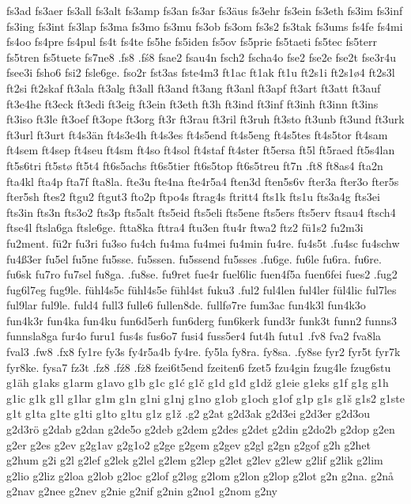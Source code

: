 fs3ad
fs3aer
fs3all
fs3alt
fs3amp
fs3an
fs3ar
fs3äus
fs3ehr
fs3ein
fs3eth
fs3im
fs3inf
fs3ing
fs3int
fs3lap
fs3ma
fs3mo
fs3mu
fs3ob
fs3om
fs3s2
fs3tak
fs3ums
fs4fe
fs4mi
fs4oo
fs4pre
fs4pul
fs4t
fs4te
fs5he
fs5iden
fs5ov
fs5prie
fs5taeti
fs5tec
fs5terr
fs5tren
fs5tuete
fs7ne8
.fs8
.fś8
fsae2
fsau4n
fsch2
fscha4o
fse2
fse2e
fse2t
fse3r4u
fsee3i
fsho6
fsi2
fsle6ge.
fso2r
fst3as
fste4m3
ft1ac
ft1ak
ft1u
ft2s1i
ft2s1ø4
ft2s3l
ft2si
ft2skaf
ft3ala
ft3alg
ft3all
ft3and
ft3ang
ft3anl
ft3apf
ft3art
ft3att
ft3auf
ft3e4he
ft3eck
ft3edi
ft3eig
ft3ein
ft3eth
ft3h
ft3ind
ft3inf
ft3inh
ft3inn
ft3ins
ft3iso
ft3le
ft3oef
ft3ope
ft3org
ft3r
ft3rau
ft3ril
ft3ruh
ft3sto
ft3unb
ft3und
ft3urk
ft3url
ft3urt
ft4s3än
ft4s3e4h
ft4s3es
ft4s5end
ft4s5eng
ft4s5tes
ft4s5tor
ft4sam
ft4sem
ft4sep
ft4seu
ft4sm
ft4so
ft4sol
ft4staf
ft4ster
ft5ersa
ft5l
ft5raed
ft5s4lan
ft5s6tri
ft5stø
ft5t4
ft6s5achs
ft6s5tier
ft6s5top
ft6s5treu
ft7n
.ft8
ft8as4
fta2n
fta4kl
fta4p
fta7f
fta8la.
fte3u
fte4na
fte4r5a4
ften3d
ften5s6v
fter3a
fter3o
fter5s
fter5sh
ftes2
ftgu2
ftgut3
fto2p
ftpo4s
ftrag4s
ftritt4
fts1k
fts1u
fts3a4g
fts3ei
fts3in
fts3n
fts3o2
fts3p
fts5alt
fts5eid
fts5eli
fts5ene
fts5ers
fts5erv
ftsau4
ftsch4
ftse4l
ftsla6ga
ftsle6ge.
ftta8ka
fttra4
ftu3en
ftu4r
ftwa2
ftz2
fü1s2
fu2m3i
fu2ment.
fü2r
fu3ri
fu3so
fu4ch
fu4ma
fu4mei
fu4min
fu4re.
fu4s5t
.fu4sc
fu4schw
fu4ß3er
fu5el
fu5ne
fu5sse.
fu5ssen.
fu5ssend
fu5sses
.fu6ge.
fu6le
fu6ra.
fu6re.
fu6sk
fu7ro
fu7sel
fu8ga.
.fu8se.
fu9ret
fue4r
fuel6lic
fuen4f5a
fuen6fei
fues2
.fug2
fug6l7eg
fug9le.
fühl4s5c
fühl4s5e
fühl4st
fuku3
.ful2
ful4len
ful4ler
fül4lic
ful7les
ful9lar
ful9le.
fuld4
full3
fulle6
fullen8de.
fullfø7re
fum3ac
fun4k3l
fun4k3o
fun4k3r
fun4ka
fun4ku
fun6d5erh
fun6derg
fun6kerk
fund3r
funk3t
funn2
funns3
funnsla8ga
fur4o
furu1
fus4s
fus6o7
fusi4
fuss5er4
fut4h
futu1
.fv8
fva2
fva8la
fval3
.fw8
.fx8
fy1re
fy3s
fy4r5a4b
fy4re.
fy5la
fy8ra.
fy8sa.
.fy8se
fyr2
fyr5t
fyr7k
fyr8ke.
fysa7
fz3t
.fz8
.fź8
.fż8
fzei6t5end
fzeiten6
fzet5
fzu4gin
fzug4le
fzug6stu
g1äh
g1aks
g1arm
g1avo
g1b
g1c
g1ć
g1č
g1d
g1đ
g1dž
g1eie
g1eks
g1f
g1g
g1h
g1ic
g1k
g1l
g1lar
g1m
g1n
g1ni
g1nj
g1no
g1ob
g1och
g1of
g1p
g1s
g1š
g1s2
g1ste
g1t
g1ta
g1te
g1ti
g1to
g1tu
g1z
g1ž
.g2
g2at
g2d3ak
g2d3ei
g2d3er
g2d3ou
g2d3rö
g2dab
g2dan
g2de5o
g2deb
g2dem
g2des
g2det
g2din
g2do2b
g2dop
g2en
g2er
g2es
g2ev
g2g1av
g2g1o2
g2ge
g2gem
g2gev
g2gl
g2gn
g2gof
g2h
g2het
g2hum
g2i
g2l
g2lef
g2lek
g2lel
g2lem
g2lep
g2let
g2lev
g2lew
g2lif
g2lik
g2lim
g2lio
g2liz
g2loa
g2lob
g2loc
g2lof
g2løg
g2lom
g2lon
g2lop
g2lot
g2n
g2na.
g2nå
g2nav
g2nee
g2nev
g2nie
g2nif
g2nin
g2no1
g2nom
g2ny
